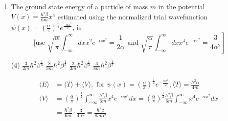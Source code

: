 \begin{enumerate}
\begin{tasks}
\task[\textbf{C.}] $\left(n+\frac{1}{2}\right)^{5 / 3} \lambda^{1 / 3}$
\task[\textbf{D.}] $\left(n+\frac{1}{2}\right)^{5 / 3} \lambda^{2 / 3}$
\end{tasks}
\begin{answer}
\begin{align*}
\intertext{From W.K.B approximation}\\
&4. \int_{0}^{x} P d x \propto\left(n+\frac{1}{2}\right) h\\
&4 \int_{0}^{\left(\frac{E}{\lambda}\right)^{1 / 4}} \sqrt{2 m\left(E-\lambda x^{4} d x\right)} \propto\left(n+\frac{1}{2}\right) h
\intertext{making the integration dimensional}
&4 \times(2 m E)^{1 / 2}\left(\frac{E}{\lambda}\right)^{1 / 4} \int_{0}^{1} \sqrt{1-t^{4}} d t \propto\left(n+\frac{1}{2}\right) \\&\Rightarrow E^{3 / 4} \propto\left(n+\frac{1}{2}\right) \lambda^{1 / 4} \Rightarrow E \propto\left(n+\frac{1}{2}\right)^{4 / 3} \lambda^{1 / 3}
\end{align*}
So the correct answer is \textbf{Option (A)}
\end{answer}
\item The ground state energy of a particle of mass $m$ in the potential $V(x)=\frac{\hbar^{2} \beta}{6 m} x^{4}$ estimated using the normalized trial wavefunction $\psi(x)=\left(\frac{\alpha}{\pi}\right)^{\frac{1}{4}} e^{\frac{-\alpha x^{2}}{2}}$, is
$$
\text { [use } \left.\sqrt{\frac{\alpha}{\pi}} \int_{-\infty}^{\infty} d x x^{2} e^{-\alpha x^{2}}=\frac{1}{2 \alpha} \text { and } \sqrt{\frac{\alpha}{\pi}} \int_{-\infty}^{\infty} d x x^{4} e^{-\alpha x^{2}}=\frac{3}{4 \alpha^{2}}\right]
$$
{}
\begin{tasks}(4)
\task[\textbf{A.}] $\frac{3}{2 m} \hbar^{2} \beta^{\frac{1}{3}}$
\task[\textbf{B.}] $\frac{8}{3 m} \hbar^{2} \beta^{\frac{1}{3}}$
\task[\textbf{C.}] $\frac{2}{3 m} \hbar^{2} \beta^{\frac{1}{3}}$
\task[\textbf{D.}] $\frac{3}{8 m} \hbar^{2} \beta^{\frac{1}{3}}$
\end{tasks}
\begin{answer}
\begin{align*}
\langle E\rangle&=\langle T\rangle+\langle V\rangle,\text{ for } \psi(x)=\left(\frac{\alpha}{\pi}\right)^{\frac{1}{4}} e^{-\frac{\alpha x^{2}}{2}},\langle T\rangle=\frac{\hbar^{2} \alpha}{4 m}\\
\langle V\rangle&=\left(\frac{\alpha}{\pi}\right)^{\frac{1}{2}} \int_{-\infty}^{\infty} \frac{\hbar^{2} \beta}{6 m} x^{4} e^{-\alpha x^{2}} d x=\left(\frac{\alpha}{\pi}\right)^{\frac{1}{2}} \frac{\hbar^{2} \beta}{6 m} \int_{-\infty}^{\infty} x^{4} e^{-\alpha x^{2}} d x\\&=\frac{\hbar^{2} \beta}{6 m} \cdot \frac{3}{4 \alpha^{2}}=\frac{\hbar^{2} \beta}{8 m \alpha^{2}}\\

\end{align*}
\end{answer}
\end{enumerate}
